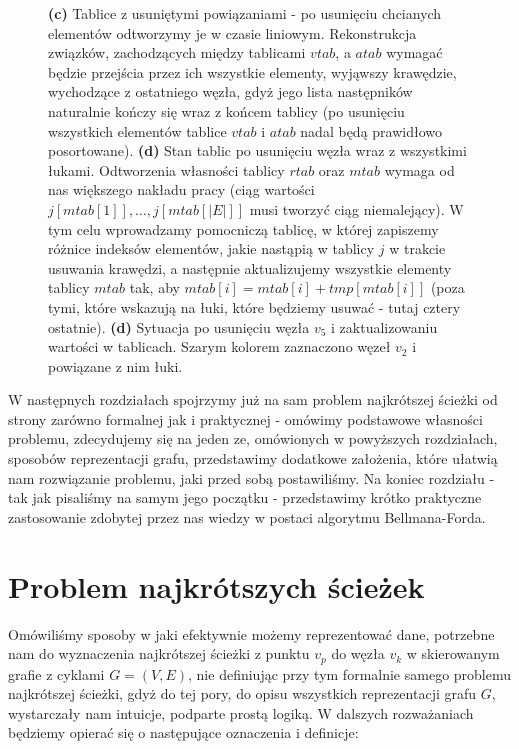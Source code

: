 \begin{figure}[!htbp]
	\caption{\textbf{(c)} Tablice z usuniętymi powiązaniami - po usunięciu chcianych elementów odtworzymy je w czasie liniowym. Rekonstrukcja związków, zachodzących między tablicami $vtab$, a $atab$ wymagać będzie przejścia przez ich wszystkie elementy, wyjąwszy krawędzie, wychodzące z ostatniego węzła, gdyż jego lista następników naturalnie kończy się wraz z końcem tablicy (po usunięciu wszystkich elementów tablice $vtab$ i $atab$ nadal będą prawidłowo posortowane). \textbf{(d)} Stan tablic po usunięciu węzła wraz z wszystkimi łukami. Odtworzenia własności tablicy $rtab$ oraz $mtab$ wymaga od nas większego nakładu pracy (ciąg wartości  \\ $j \left[ mtab \left[ 1 \right] \right], \ldots, j \left[ mtab \left[ \left| E \right| \right] \right] $ musi tworzyć ciąg niemalejący). W tym celu wprowadzamy pomocniczą tablicę, w której zapiszemy różnice indeksów elementów, jakie nastąpią w tablicy $j$ w trakcie usuwania krawędzi, a następnie aktualizujemy wszystkie elementy tablicy $mtab$ tak, aby $mtab \left[i \right] = mtab \left[i \right] + tmp \left[ mtab \left[ i \right] \right]$ (poza tymi, które wskazują na łuki, które będziemy usuwać - tutaj cztery ostatnie). \textbf{(d)} Sytuacja po usunięciu węzła $v_{5}$ i zaktualizowaniu wartości w tablicach. Szarym kolorem zaznaczono węzeł $v_{2}$ i powiązane z nim łuki.  }\label{fig:forwardReverseStarRepresentationDeleteNode1}
\end{figure}

W następnych rozdziałach spojrzymy już na sam problem najkrótszej ścieżki od strony zarówno formalnej jak i praktycznej - omówimy podstawowe własności problemu, zdecydujemy się na jeden ze, omówionych w powyższych rozdziałach, sposobów reprezentacji grafu, przedstawimy dodatkowe założenia, które ułatwią nam rozwiązanie problemu, jaki przed sobą postawiliśmy. Na koniec rozdziału - tak jak pisaliśmy na samym jego początku - przedstawimy krótko praktyczne zastosowanie zdobytej przez nas wiedzy w postaci algorytmu Bellmana-Forda.

\section{Problem najkrótszych ścieżek}
\label{sec:shortestPathProblem}

Omówiliśmy sposoby w jaki efektywnie możemy reprezentować dane, potrzebne nam do wyznaczenia najkrótszej ścieżki z punktu $v_{p}$ do węzła $v_{k}$ w skierowanym grafie z cyklami $G = \left( V, E \right)$, nie definiując przy tym formalnie samego problemu najkrótszej ścieżki, gdyż do tej pory, do opisu wszystkich reprezentacji grafu $G$, wystarczały nam intuicje, podparte prostą logiką. W dalszych rozważaniach będziemy opierać się o następujące oznaczenia i definicje:

